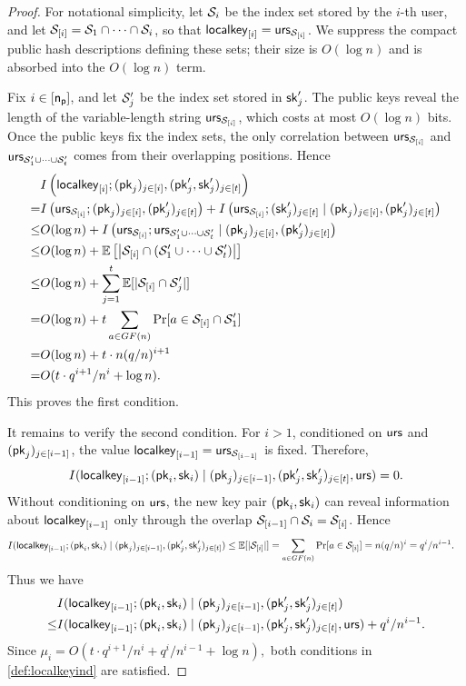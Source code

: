 \begin{proof}
For notational simplicity, let $\mathcal{S}_i$ be the index set stored by the $i$-th user, and let
$\mathcal{S}_{[i]}=\mathcal{S}_1\cap\cdots\cap\mathcal{S}_i$, so that $\mathsf{localkey}_{[i]}=\mathsf{urs}_{\mathcal{S}_{[i]}}$.
We suppress the compact public hash descriptions defining these sets; their size is $O(\log n)$ and is absorbed into the $O(\log n)$ term.

Fix $i\in[\mathsf{n_p}]$, and let $\mathcal{S}'_j$ be the index set stored in $\mathsf{sk}'_j$. The public keys reveal the length of the variable-length string $\mathsf{urs}_{\mathcal{S}_{[i]}}$, which costs at most $O(\log n)$ bits. Once the public keys fix the index sets, the only correlation between $\mathsf{urs}_{\mathcal{S}_{[i]}}$ and $\mathsf{urs}_{\mathcal{S}'_1\cup\cdots\cup\mathcal{S}'_t}$ comes from their overlapping positions. Hence
\[
\begin{aligned}
&I\left(
\mathsf{localkey}_{[i]};
(\mathsf{pk}_j)_{j\in[i]},(\mathsf{pk}'_j,\mathsf{sk}'_j)_{j\in[t]}
\right)\\
=&
I\left(
\mathsf{urs}_{\mathcal{S}_{[i]}};
(\mathsf{pk}_j)_{j\in[i]},(\mathsf{pk}'_j)_{j\in[t]}
\right)
+
I\left(
\mathsf{urs}_{\mathcal{S}_{[i]}};
(\mathsf{sk}'_j)_{j\in[t]}
\mid
(\mathsf{pk}_j)_{j\in[i]},(\mathsf{pk}'_j)_{j\in[t]}
\right)\\
\leq&
O(\log n)
+
I\left(
\mathsf{urs}_{\mathcal{S}_{[i]}};
\mathsf{urs}_{\mathcal{S}'_1\cup\cdots\cup\mathcal{S}'_t}
\mid
(\mathsf{pk}_j)_{j\in[i]},(\mathsf{pk}'_j)_{j\in[t]}
\right)\\
\leq&
O(\log n)
+
\mathbb E\left[\left|\mathcal{S}_{[i]}\cap(\mathcal{S}'_1\cup\cdots\cup\mathcal{S}'_t)\right|\right]\\
\leq&
O(\log n)+\sum_{j=1}^t \mathbb E[|\mathcal{S}_{[i]}\cap\mathcal{S}'_j|]\\
=&
O(\log n)+t\sum_{a\in GF(n)}\Pr[a\in\mathcal{S}_{[i]}\cap\mathcal{S}'_1]\\
=&
O(\log n)+t\cdot n(q/n)^{i+1}\\
=&
O(t\cdot q^{i+1}/n^i+\log n).
\end{aligned}
\]
This proves the first condition.

It remains to verify the second condition. For $i>1$, conditioned on $\mathsf{urs}$ and $(\mathsf{pk}_j)_{j\in[i-1]}$, the value $\mathsf{localkey}_{[i-1]}=\mathsf{urs}_{\mathcal{S}_{[i-1]}}$ is fixed. Therefore,
\[
I(\mathsf{localkey}_{[i-1]};(\mathsf{pk}_i,\mathsf{sk}_i)\mid(\mathsf{pk}_j)_{j\in[i-1]},(\mathsf{pk}'_j,\mathsf{sk}'_j)_{j\in[t]},\mathsf{urs})=0.
\]
Without conditioning on $\mathsf{urs}$, the new key pair $(\mathsf{pk}_i,\mathsf{sk}_i)$ can reveal information about $\mathsf{localkey}_{[i-1]}$ only through the overlap
$\mathcal{S}_{[i-1]}\cap\mathcal{S}_i=\mathcal{S}_{[i]}$. Hence
\[
\begin{aligned}
&I(\mathsf{localkey}_{[i-1]};(\mathsf{pk}_i,\mathsf{sk}_i)\mid(\mathsf{pk}_j)_{j\in[i-1]},(\mathsf{pk}'_j,\mathsf{sk}'_j)_{j\in[t]})
\leq
\mathbb E[|\mathcal{S}_{[i]}|]
=
\sum_{a\in GF(n)}\Pr[a\in\mathcal{S}_{[i]}]
=
n(q/n)^i
=
q^i/n^{i-1}.
\end{aligned}
\]
Thus we have
\[
\begin{aligned}
&I(\mathsf{localkey}_{[i-1]};(\mathsf{pk}_i,\mathsf{sk}_i)\mid(\mathsf{pk}_j)_{j\in[i-1]},(\mathsf{pk}'_j,\mathsf{sk}'_j)_{j\in[t]})\\
\leq&
I(\mathsf{localkey}_{[i-1]};(\mathsf{pk}_i,\mathsf{sk}_i)\mid(\mathsf{pk}_j)_{j\in[i-1]},(\mathsf{pk}'_j,\mathsf{sk}'_j)_{j\in[t]},\mathsf{urs})
+
q^i/n^{i-1}.
\end{aligned}
\]
Since
$
\mu_i=O(t\cdot q^{i+1}/n^i+q^i/n^{i-1}+\log n),
$
both conditions in \cref{def:localkeyind} are satisfied.
\end{proof}

